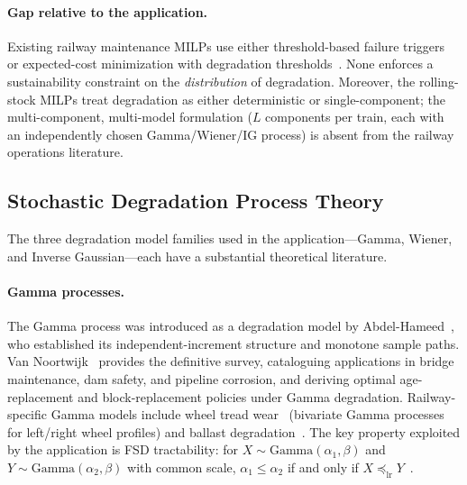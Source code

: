 \documentclass[11pt,a4paper]{article}
\theoremstyle{plain}
\theoremstyle{definition}
\theoremstyle{remark}
\begin{document}
\paragraph{Gap relative to the application.}
Existing railway maintenance MILPs use either threshold-based failure triggers~\cite{railcarMILP2025,budai2006} or expected-cost minimization with degradation thresholds~\cite{compare2020}. None enforces a sustainability constraint on the \emph{distribution} of degradation. Moreover, the rolling-stock MILPs treat degradation as either deterministic or single-component; the multi-component, multi-model formulation ($L$ components per train, each with an independently chosen Gamma/Wiener/IG process) is absent from the railway operations literature.

\subsection{Stochastic Degradation Process Theory}
\label{sec:related:s4}

The three degradation model families used in the application---Gamma, Wiener, and Inverse Gaussian---each have a substantial theoretical literature.

\paragraph{Gamma processes.}
The Gamma process was introduced as a degradation model by Abdel-Hameed~\cite{abdelhameed1975}, who established its independent-increment structure and monotone sample paths. Van Noortwijk~\cite{vannoortwijk2009} provides the definitive survey, cataloguing applications in bridge maintenance, dam safety, and pipeline corrosion, and deriving optimal age-replacement and block-replacement policies under Gamma degradation. Railway-specific Gamma models include wheel tread wear~\cite{dai2022,freitas2009} (bivariate Gamma processes for left/right wheel profiles) and ballast degradation~\cite{compare2020}. The key property exploited by the application is FSD tractability: for $X\sim\mathrm{Gamma}(\alpha_1,\beta)$ and $Y\sim\mathrm{Gamma}(\alpha_2,\beta)$ with common scale, $\alpha_1\le\alpha_2$ if and only if $X\preceq_{\mathrm{lr}}Y$~\cite{shaked2007}.

\end{document}
